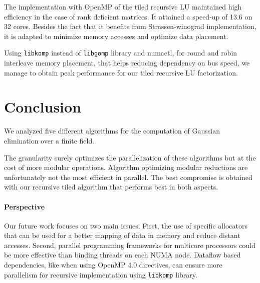 \documentclass{article}
\newcommand{\libkomp}{\texttt{libkomp}\xspace}
\newcommand{\libgomp}{\texttt{libgomp}\xspace}
\begin{document}
 
 
 
 
 

 
 
 
The implementation with OpenMP of the tiled recursive LU maintained high
efficiency in the case of rank deficient matrices. It attained a speed-up of
13.6 on 32 cores. Besides the fact that it benefits from Strassen-winograd
implementation, it is adapted to minimize memory accesses and optimize data
placement.
 
 
Using \libkomp instead of
\libgomp library and numactl, for round and robin interleave memory placement,
that helps reducing dependency on bus speed, we manage to obtain peak
performance for our tiled recursive LU factorization.

 
 
 
 
 
 
 
 
 

 

\section{Conclusion}
We analyzed five different algorithms for the computation of Gaussian
elimination over a finite field.
 
The granularity surely optimizes the parallelization of these
algorithms but at the cost of more modular operations. 
Algorithm optimizing modular reductions are unfortunately not the most efficient
in parallel. The best compromise is obtained with our recursive tiled algorithm
that performs best in both aspects.
 
 
 
 
 
 
 
 
 
\vspace{-1em}
\paragraph{Perspective}
Our future work focuses on two main issues. First, the use of specific allocators
that can be used for a better mapping of data in memory and reduce distant accesses.
Second, parallel programming frameworks for multicore processors \cite{KLDB10}
could be more effective than binding threads on each NUMA node.  
Dataflow based dependencies, like when using OpenMP 4.0 directives, 
can ensure more parallelism for recursive implementation using \libkomp\cite{BGD12} library.
 
\end{document}
